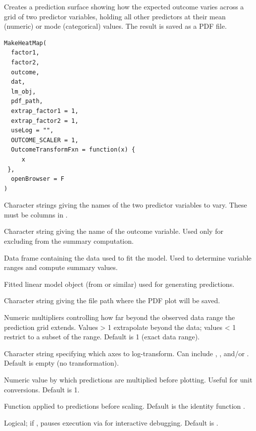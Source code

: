 \documentclass[a4paper]{book}
\begin{document}
%
\begin{Description}
Creates a prediction surface showing how the expected outcome varies across
a grid of two predictor variables, holding all other predictors at their
mean (numeric) or mode (categorical) values. The result is saved as a PDF
file.
\end{Description}
%
\begin{Usage}
\begin{verbatim}
MakeHeatMap(
  factor1,
  factor2,
  outcome,
  dat,
  lm_obj,
  pdf_path,
  extrap_factor1 = 1,
  extrap_factor2 = 1,
  useLog = "",
  OUTCOME_SCALER = 1,
  OutcomeTransformFxn = function(x) {
     x
 },
  openBrowser = F
)
\end{verbatim}
\end{Usage}
%
\begin{Arguments}
\begin{ldescription}
\item[\code{factor1}, \code{factor2}] Character strings giving the names of the two
predictor variables to vary. These must be columns in .

\item[\code{outcome}] Character string giving the name of the outcome variable.
Used only for excluding from the summary computation.

\item[\code{dat}] Data frame containing the data used to fit the model. Used to
determine variable ranges and compute summary values.

\item[\code{lm\_obj}] Fitted linear model object (from  or similar) used
for generating predictions.

\item[\code{pdf\_path}] Character string giving the file path where the PDF plot
will be saved.

\item[\code{extrap\_factor1}, \code{extrap\_factor2}] Numeric multipliers controlling how far
beyond the observed data range the prediction grid extends. Values > 1
extrapolate beyond the data; values < 1 restrict to a subset of the range.
Default is 1 (exact data range).

\item[\code{useLog}] Character string specifying which axes to log-transform.
Can include , , and/or . Default is empty
(no transformation).

\item[\code{OUTCOME\_SCALER}] Numeric value by which predictions are multiplied
before plotting. Useful for unit conversions. Default is 1.

\item[\code{OutcomeTransformFxn}] Function applied to predictions before scaling.
Default is the identity function .

\item[\code{openBrowser}] Logical; if , pauses execution via
 for interactive debugging. Default is .
\end{ldescription}
\end{Arguments}
\end{document}
